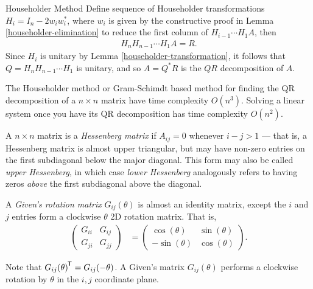 \begin{thm}{Householder Method}\proofbreak
    Define sequence of Householder transformations $H_i = I_n - 2w_iw_i^{*}$, where $w_i$ is given by the constructive proof in Lemma \ref{householder-elimination} to reduce the first column of $H_{i-1}\cdots H_1A$, then
    \begin{align*}
        H_nH_{n-1}\cdots H_1A = R.
    \end{align*}
    Since $H_i$ is unitary by Lemma \ref{householder-transformation}, it follows that $Q = H_nH_{n-1}\cdots H_1$ is unitary, and so $A = Q^{*}R$ is the $QR$ decomposition of $A$.
\end{thm}

\begin{rmk}
    The Householder method or Gram-Schimdt based method for finding the QR decomposition of a $n \times n$ matrix have time complexity $O(n^3)$. Solving a linear system once you have its QR decomposition has time complexity $O(n^2)$.
\end{rmk}

\begin{defn}
    A $n \times n$ matrix is a \emph{Hessenberg matrix} if $A_{ij} = 0$ whenever $i - j > 1$ --- that is, a Hessenberg matrix is almost upper triangular, but may have non-zero entries on the first subdiagonal below the major diagonal. This form may also be called \emph{upper Hessenberg}, in which case \emph{lower Hessenberg} analogously refers to having zeros \emph{above} the first subdiagonal above the diagonal.
\end{defn}

\begin{defn}
    A \emph{Given's rotation matrix} $G_{ij}(\theta)$ is almost an identity matrix, except the $i$ and $j$ entries form a clockwise $\theta$ 2D rotation matrix. That is,
    \begin{align*}
        \begin{pmatrix}
            G_{ii} & G_{ij} \\ G_{ji} & G_{jj}
        \end{pmatrix} &= \begin{pmatrix}
            \cos(\theta) & \sin(\theta) \\ -\sin(\theta) & \cos(\theta)
        \end{pmatrix}.
    \end{align*}
\end{defn}

\begin{rmk}
    Note that ${G_{ij}(\theta)}^{\mkern-1.5mu\mathsf{T}} = G_{ij}(-\theta)$. A Given's matrix $G_{ij}(\theta)$ performs a clockwise rotation by $\theta$ in the $i,j$ coordinate plane.
\end{rmk}

